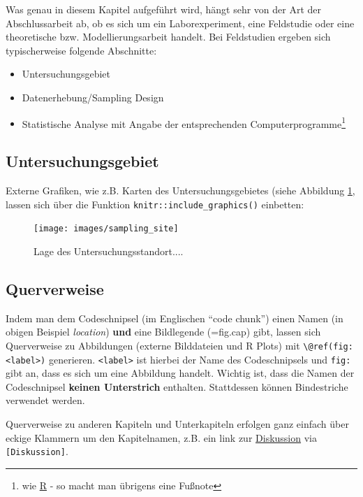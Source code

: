 \documentclass[a4paper,12pt]{article}
\providecommand{\tightlist}{%
  \setlength{\itemsep}{0pt}\setlength{\parskip}{0pt}}
\begin{document}
Was genau in diesem Kapitel aufgeführt wird, hängt sehr von der Art der Abschlussarbeit ab, ob es sich um ein Laborexperiment, eine Feldstudie oder eine theoretische bzw. Modellierungsarbeit handelt. Bei Feldstudien ergeben sich typischerweise folgende Abschnitte:
\begin{itemize}
\tightlist
\item
  Untersuchungsgebiet
\item
  Datenerhebung/Sampling Design
\item
  Statistische Analyse mit Angabe der entsprechenden Computerprogramme\footnote{wie \href{https://cran.r-project.org/}{R} - so macht man übrigens eine Fußnote}
\end{itemize}
\hypertarget{untersuchungsgebiet}{%
\subsection{Untersuchungsgebiet}\label{untersuchungsgebiet}}

Externe Grafiken, wie z.B. Karten des Untersuchungsgebietes (siehe Abbildung \ref{fig:location}, lassen sich über die Funktion \texttt{knitr::include\_graphics()} einbetten:
\begin{figure}

{\centering \texttt{[image: images/sampling\_site]} 

}

\caption{Lage des Untersuchungsstandort....}\label{fig:location}
\end{figure}
\hypertarget{querverweise}{%
\subsection{Querverweise}\label{querverweise}}

Indem man dem Codeschnipsel (im Englischen \enquote{code chunk}) einen Namen (in obigen Beispiel \emph{location}) \textbf{und} eine Bildlegende (=fig.cap) gibt, lassen sich Querverweise zu Abbildungen (externe Bilddateien und R Plots) mit \texttt{\textbackslash{}@ref(fig:\textless{}label\textgreater{})} generieren. \texttt{\textless{}label\textgreater{}} ist hierbei der Name des Codeschnipsels und \texttt{fig:} gibt an, dass es sich um eine Abbildung handelt. Wichtig ist, dass die Namen der Codeschnipsel \textbf{keinen Unterstrich} enthalten. Stattdessen können Bindestriche verwendet werden.

Querverweise zu anderen Kapiteln und Unterkapiteln erfolgen ganz einfach über eckige Klammern um den Kapitelnamen, z.B. ein link zur \protect\hyperlink{diskussion}{Diskussion} via \texttt{{[}Diskussion{]}}.
\end{document}
